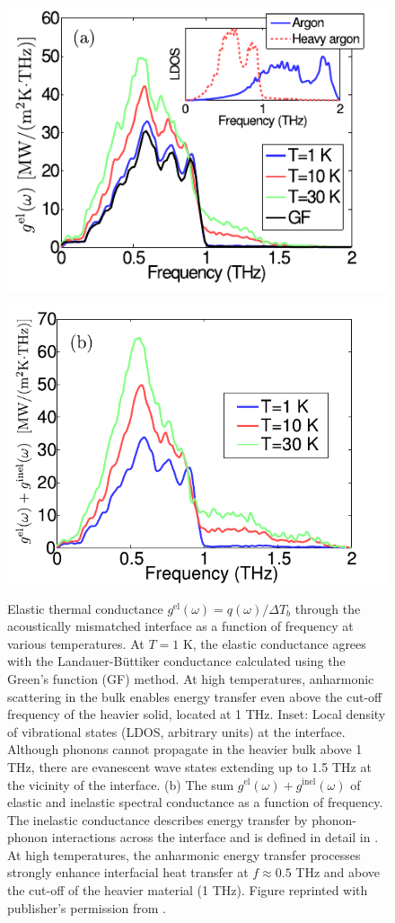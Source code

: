 \begin{figure}[tb]
 \begin{center}
  \includegraphics[width=.49\columnwidth]{pics/nemd_fig4a.pdf}
  \includegraphics[width=.49\columnwidth]{pics/nemd_fig4b.pdf}
  \caption{Elastic thermal conductance $g^{\textrm{el}}(\omega)=q(\omega)/\Delta T_b$ through the acoustically mismatched interface as a function of frequency at various temperatures.  At $T=1$ K, the elastic conductance agrees with the Landauer-B\"uttiker conductance calculated using the Green's function (GF) method. At high temperatures, anharmonic scattering in the bulk enables energy transfer even above the cut-off frequency of the heavier solid, located at 1 THz.  Inset: Local density of vibrational states (LDOS, arbitrary units) at the interface. Although phonons cannot propagate in the heavier bulk above 1 THz, there are evanescent wave states extending up to 1.5 THz at the vicinity of the interface. (b) The sum $g^{\textrm{el}}(\omega)+ g^{\textrm{inel}}(\omega)$ of elastic and inelastic spectral conductance as a function of frequency. The inelastic conductance describes energy transfer by phonon-phonon interactions across the interface and is defined in detail in . At high temperatures, the anharmonic energy transfer processes strongly enhance interfacial heat transfer at $f\approx 0.5$ THz and above the cut-off of the heavier material (1 THz). Figure reprinted with publisher's permission from .} 
 \label{fig:nemd_fig2}
 \end{center}
\end{figure}

